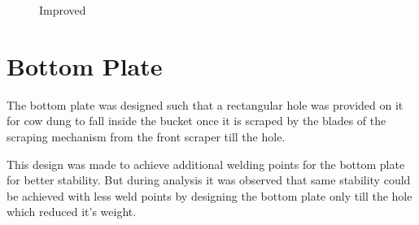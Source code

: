 \begin{figure}[H]
\begin{minipage}{0.40\textwidth}
      \caption{Improved}
      \label{fig:Improved}
    \end{minipage}
\end{figure}

\section{Bottom Plate}

The bottom plate was designed such that a rectangular hole was provided on it for cow dung to fall inside the bucket once it is scraped by the blades of the scraping mechanism from the front scraper till the hole.

This design was made to achieve additional welding points for the bottom plate for better stability. But during analysis it was observed that same stability could be achieved with less weld points by designing the bottom plate only till the hole which reduced it's weight.

